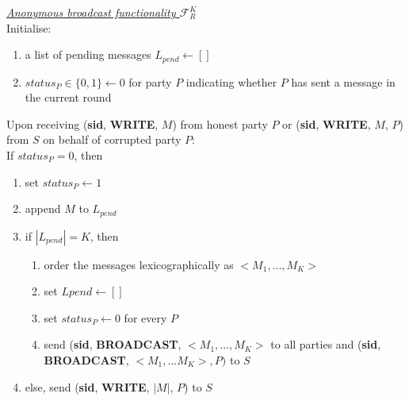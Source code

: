 \begin{tcolorbox}[colback=white, arc=5pt]
\noindent\emph{\underline{Anonymous broadcast functionality $\mathcal{F}_R^K$}}\\[5pt]
 Initialise:
 \begin{enumerate}
     \item a list of pending messages $L_{pend} \leftarrow []$
     \item $status_P\in\{0,1\}\leftarrow 0$ for party $P$ indicating whether $P$ has sent a message in the current round
 \end{enumerate}
 
 
\extitem Upon receiving (\textbf{sid}, \textbf{WRITE}, $M$) from honest party $P$ or (\textbf{sid}, \textbf{WRITE}, $M$, $P$) from $S$ on behalf of corrupted party $P$:\\
If $status_P=0$, then
\begin{enumerate}
    \item set $status_P\leftarrow 1$
    \item append $M$ to $L_{pend}$
    \item if $|L_{pend}|=K$, then
    \begin{enumerate}
        \item order the messages lexicographically as $<M_1,...,M_K>$
        \item set $L{pend}\leftarrow []$
        \item set $status_P\leftarrow 0$ for every $P$
        \item send (\textbf{sid}, \textbf{BROADCAST}, $<M_1,...,M_K>$ to all parties and (\textbf{sid}, \textbf{BROADCAST}, $<M_1,...M_K>, P)$ to $S$
    \end{enumerate}
    \item else, send (\textbf{sid}, \textbf{WRITE}, $|M|$, $P$) to $S$
\end{enumerate}





\end{tcolorbox}
\label{fig:riposte_functionality}